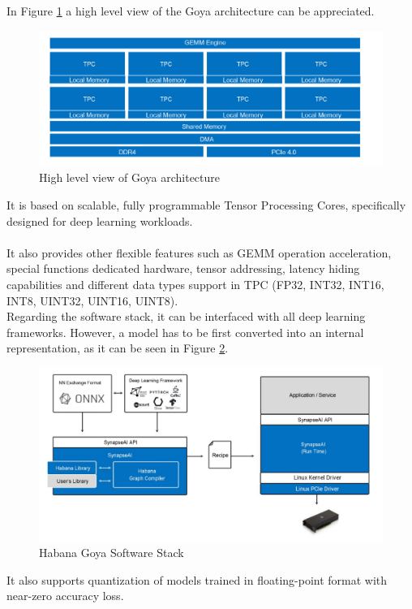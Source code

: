 In Figure \ref{fig:goyaarch} a high level view of the Goya architecture can be appreciated.
\begin{figure}[H]
\centering
\captionsetup{justification=centering}
\includegraphics[scale=0.7]{./figure/goya_arch.PNG}
\caption{High level view of Goya architecture \cite{paper:38}}
\label{fig:goyaarch}
\end{figure}

It is based on scalable, fully programmable Tensor Processing Cores, specifically designed for deep learning workloads. \\\\
It also provides other flexible features such as GEMM operation acceleration, special functions dedicated hardware, tensor addressing, latency hiding capabilities and different data types support in TPC (FP32, INT32, INT16, INT8, UINT32, UINT16, UINT8).\\

Regarding the software stack, it can be interfaced with all deep learning frameworks. However, a model has to be first converted into an internal representation, as it can be seen in Figure \ref{fig:goyaswstack}.
\begin{figure}[H]
\centering
\captionsetup{justification=centering}
\includegraphics[scale=0.5]{./figure/goya_sw_stack.PNG}
\caption{Habana Goya Software Stack \cite{paper:38}}
\label{fig:goyaswstack}
\end{figure}
It also supports quantization of models trained in floating-point format with near-zero accuracy loss.